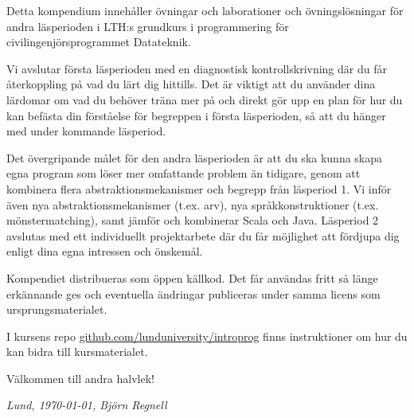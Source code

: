 


Detta kompendium innehåller övningar och laborationer och övningslösningar för andra läsperioden i LTH:s grundkurs i programmering för civilingenjörsprogrammet Datateknik.


Vi avslutar första läsperioden med en diagnostisk kontrollskrivning där du får återkoppling på vad du lärt dig hittills. Det är viktigt att du använder dina lärdomar om vad du behöver träna mer på och direkt gör upp en plan för hur du kan befästa din förståelse för begreppen i första läsperioden, så att du hänger med under kommande läsperiod.

Det övergripande målet för den andra läsperioden är att du ska kunna skapa egna program som löser mer omfattande problem än tidigare, genom att kombinera flera abstraktionsmekanismer och begrepp från läsperiod 1. Vi inför även nya abstraktionsmekanismer (t.ex. arv), nya språkkonstruktioner (t.ex. mönstermatching), samt jämför och kombinerar Scala och Java. Läsperiod 2 avslutas med ett individuellt projektarbete där du får möjlighet att fördjupa dig enligt dina egna intressen och önskemål.

Kompendiet distribueras som öppen källkod. Det får användas fritt så länge erkännande ges och eventuella ändringar publiceras under samma licens som ursprungsmaterialet. 

I kursens repo \href{http://github.com/lunduniversity/introprog}{github.com/lunduniversity/introprog} finns instruktioner om hur du kan bidra till kursmaterialet.

Välkommen till andra halvlek!

\vspace{1em}\noindent \textit{\hfill Lund, \today, Björn Regnell}
